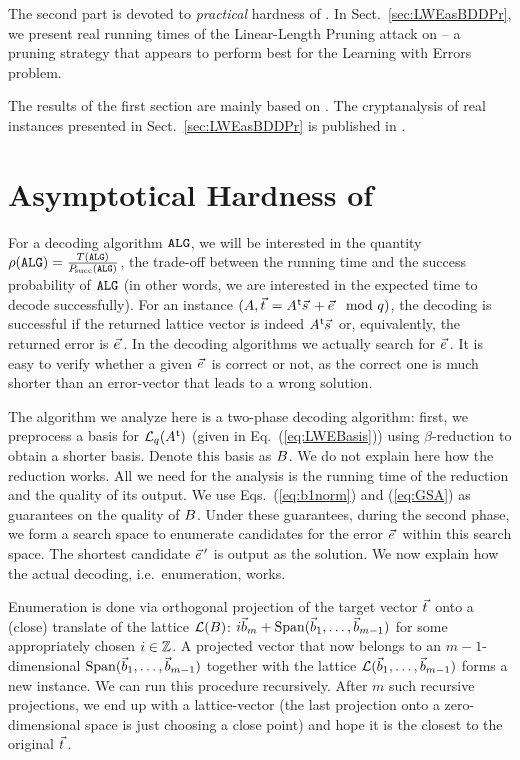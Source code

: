 The second part is devoted to \emph{practical} hardness of \LWE. In Sect.~\ref{sec:LWEasBDDPr}, we present real running times of the Linear-Length Pruning attack on \LWE{} -- a pruning strategy that appears to perform best for the Learning with Errors problem.

The results of the first section are mainly based on \cite{DCC:HKM}. The cryptanalysis of real \LWE instances presented in Sect.~\ref{sec:LWEasBDDPr} is published in \cite{ACNS:KMW16}.

\section{Asymptotical Hardness of \LWE} \label{sec:LWEasBDDAs}
For a decoding algorithm $\texttt{ALG}$, we will be interested in the quantity $\rho(\texttt{ALG}) = \frac{T(\texttt{ALG})}{P\mkern-4mu_{\mbox{\tiny succ}}(\texttt{ALG})}$, the trade-off between the running time and the success probability of $\texttt{ALG}$ (in other words, we are interested in the expected time to decode successfully).  For an \LWE instance $(\AMat, \tvec = \AMat\transpose \svec + \evec \mod q)$, the decoding is successful if the returned lattice vector is indeed $\AMat\transpose \svec$ or, equivalently, the returned error is $\evec$. In the decoding algorithms we actually search for $\evec$.  It is easy to verify whether a given $\evec$ is correct or not, as the correct one is much shorter than an error-vector that leads to a wrong solution.

The algorithm we analyze here is a two-phase \BDD decoding algorithm: first, we preprocess a basis for $\mathcal{L}_q(A\mkern0.7mu^{\mathsf{ t}})$ (given in Eq.~(\ref{eq:LWEBasis})) using $\beta$-\BKZ reduction to obtain a shorter basis. Denote this basis as $B$. 
We do not explain here how the reduction works. 
All we need for the analysis is the running time of the reduction and the quality of its output. 
We use Eqs.~(\ref{eq:b1norm}) and (\ref{eq:GSA}) as guarantees on the quality of $B$. 
Under these guarantees, during the second phase, we form a search space
to enumerate candidates for the error $\evec$ within this search space. The shortest candidate $\evec'$ is output as the solution.  We now explain how the actual decoding, i.e.\ enumeration, works.

Enumeration is done via orthogonal projection of the target vector $\tvec$ onto a (close) translate of the lattice $\mathcal{L}(B)$: $i \vec b_m + \operatorname{Span}(\vec b_1, \ldots, \vec b_{m-1})$ for some appropriately chosen $i \in {{\mathbb Z}}$. A projected vector that now belongs to an $m-1$-dimensional $\operatorname{Span}(\vec b_1, \ldots, \vec b_{m-1})$ together with the lattice $\mathcal{L}(\vec b_1, \ldots, \vec b_{m-1})$ forms a new \BDD instance. We can run this procedure recursively. After $m$ such recursive projections, we end up with a lattice-vector (the last projection onto a zero-dimensional space is just choosing a close point) and hope it is the closest to the original $\tvec$.

